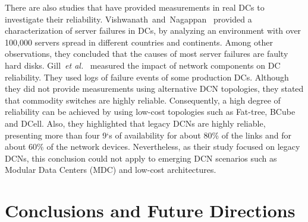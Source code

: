There are also studies that have provided measurements in real DCs to investigate their reliability. Vishwanath~and~Nagappan~\cite{vishwanath2010characterizing} provided a characterization of server failures in DCs, by analyzing an environment with over 100,000 servers spread in different countries and continents. Among other observations, they concluded that the causes of most server failures are faulty hard disks. Gill~\textit{et al.}~\cite{gill2011understanding} measured the impact of network components on DC reliability. They used logs of failure events of some production DCs. Although they did not provide measurements using alternative DCN topologies, they stated that commodity switches are highly reliable. Consequently, a high degree of reliability can be achieved by using low-cost topologies such as Fat-tree, BCube and DCell. Also, they highlighted that legacy DCNs are highly reliable, presenting more than four 9`s of availability for about 80\% of the links and for about 60\% of the network devices. Nevertheless, as their study 
focused on legacy DCNs, this conclusion could not apply to emerging DCN scenarios such as Modular Data Centers (MDC) and low-cost architectures.

\section{Conclusions and Future Directions}
\label{sec:conclusion}

